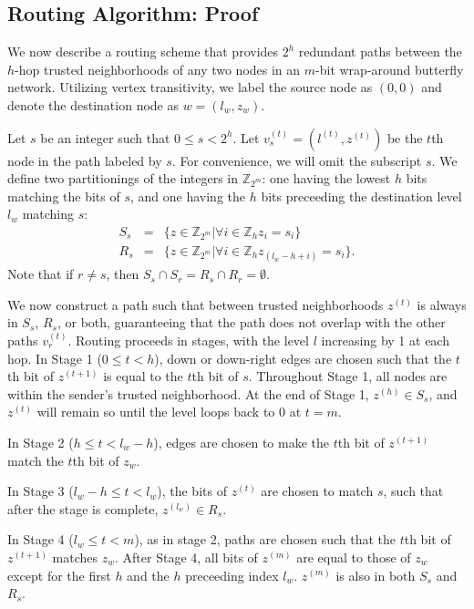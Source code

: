 \documentclass[prodmode,permissions]{acmsmall-ec16}
\newcommand{\beq}{\begin{eqnarray}}
\newcommand{\eeq}{\end{eqnarray}}
\begin{document}
\subsection{Routing Algorithm: Proof}

We now describe a routing scheme that provides $2^h$ redundant paths between
the $h$-hop trusted neighborhoods of any two nodes in an $m$-bit
wrap-around butterfly network.
Utilizing vertex transitivity, we label the source node as $(0, 0)$ and
denote the destination node as $w = (l_w, z_w)$.

Let $s$ be an integer such that $0 \leq s < 2^h$.
Let $v_s^{(t)} = (l^{(t)}, z^{(t)})$ be the $t$th node in the path labeled by $s$.
For convenience, we will omit the subscript $s$.
We define two partitionings of the integers in $\mathbb{Z}_{2^m}$:
one having the lowest $h$ bits matching the
bits of $s$, and one having the $h$ bits preceeding the destination level $l_w$
matching $s$:
\beq
S_s &=& \{z \in \mathbb{Z}_{2^m} | \forall i \in \mathbb{Z}_h z_i = s_i \} \\
R_s &=& \{z \in \mathbb{Z}_{2^m} | \forall i \in \mathbb{Z}_h z_{(l_w - h + i)} = s_i \}.
\eeq
Note that if $r \neq s$, then $S_s \cap S_r = R_s \cap R_r = \emptyset$.

We now construct a path such that between trusted neighborhoods $z^{(t)}$ is always
in $S_s$, $R_s$, or both, guaranteeing that the path does not overlap with the
other paths $v_r^{(t)}$.
Routing proceeds in stages, with the level $l$ increasing by 1 at each hop.
In Stage 1 ($0 \leq t < h$), down or down-right edges
are chosen such that the $t$th bit of $z^{(t+1)}$ is equal to the $t$th bit
of $s$. Throughout Stage 1, all nodes are within the sender's trusted neighborhood.
At the end of Stage 1, $z^{(h)} \in S_s$, and $z^{(t)}$ will remain so until the level loops
back to $0$ at $t = m$.

In Stage 2 ($h \leq t < l_w - h$), edges are chosen to make the $t$th bit of
$z^{(t+1)}$ match the $t$th bit of $z_w$.

In Stage 3 ($l_w - h \leq t < l_w$), the bits of $z^{(t)}$ are chosen to match $s$,
such that after the stage is complete, $z^{(l_w)} \in R_s$.

In Stage 4 ($l_w \leq t < m$), as in stage 2,
paths are chosen such that the $t$th bit of $z^{(t+1)}$ matches $z_w$.
After Stage 4, all bits of $z^{(m)}$ are equal to those of $z_w$
except for the first $h$ and the $h$ preceeding index $l_w$.
$z^{(m)}$ is also in both $S_s$ and $R_s$.
\end{document}
